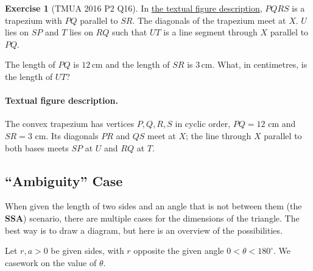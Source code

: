 \documentclass[11pt]{article}
\theoremstyle{definition}
\newtheorem{example}[theorem]{Exercise}
\theoremstyle{remark}
\newcommand{\degree}{^{\circ}}
\newcommand{\SI}[2]{#1\,\text{#2}}
\newcommand{\centi}{c}
\newcommand{\metre}{m}
\begin{document}
\begin{example}[TMUA 2016 P2 Q16]\label{tmua-3-unit-008}
    In \hyperref[fig:tmua-2016-p2-q16]{the textual figure description}, \(PQRS\) is a trapezium with \(PQ\) parallel to \(SR\). The diagonals of the trapezium meet at \(X\). \(U\) lies on \(SP\) and \(T\) lies on \(RQ\) such that \(UT\) is a line segment through \(X\) parallel to \(PQ\).

    The length of \(PQ\) is \(\SI{12}{\centi\metre}\) and the length of \(SR\) is \(\SI{3}{\centi\metre}\). What, in centimetres, is the length of \(UT\)?
\end{example}

\paragraph{Textual figure description.}\label{fig:tmua-2016-p2-q16}
The convex trapezium has vertices \(P,Q,R,S\) in cyclic order, \(PQ=12\) cm and \(SR=3\) cm. Its diagonals \(PR\) and \(QS\) meet at \(X\); the line through \(X\) parallel to both bases meets \(SP\) at \(U\) and \(RQ\) at \(T\).


\subsection{``Ambiguity'' Case}\label{tmua-3-subsection-003}

When given the length of two sides and an angle that is not between them (the \textbf{SSA}) scenario, there are multiple cases for the dimensions of the triangle. The best way is to draw a diagram, but here is an overview of the possibilities.

Let \(r,a>0\) be given sides, with \(r\) opposite the given angle \(0<\theta<180\degree\). We casework on the value of \(\theta\).
\end{document}
